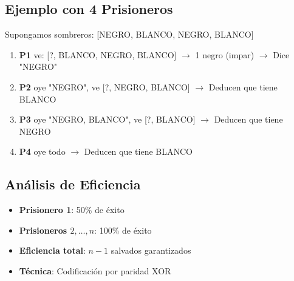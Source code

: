 \documentclass[12pt]{article}
\begin{document}
\subsection*{Ejemplo con 4 Prisioneros}

Supongamos sombreros: [NEGRO, BLANCO, NEGRO, BLANCO]

\begin{enumerate}
    \item \textbf{P1} ve: [?, BLANCO, NEGRO, BLANCO] $\rightarrow$ 1 negro (impar) $\rightarrow$ Dice "NEGRO"
    \item \textbf{P2} oye "NEGRO", ve [?, NEGRO, BLANCO] $\rightarrow$ Deducen que tiene BLANCO
    \item \textbf{P3} oye "NEGRO, BLANCO", ve [?, BLANCO] $\rightarrow$ Deducen que tiene NEGRO  
    \item \textbf{P4} oye todo $\rightarrow$ Deducen que tiene BLANCO
\end{enumerate}

\subsection*{Análisis de Eficiencia}

\begin{itemize}
    \item \textbf{Prisionero 1}: 50\% de éxito
    \item \textbf{Prisioneros $2, \ldots, n$}: 100\% de éxito
    \item \textbf{Eficiencia total}: $n-1$ salvados garantizados
    \item \textbf{Técnica}: Codificación por paridad XOR
\end{itemize}
\end{document}
